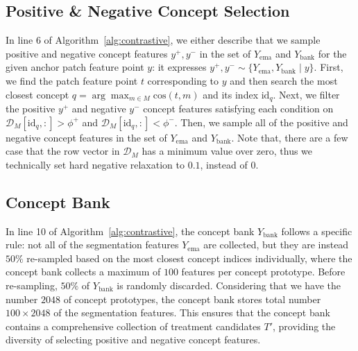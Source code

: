 \documentclass{article} \usepackage{iclr2024_conference,times}
\begin{document}
\subsection{Positive \& Negative Concept Selection}
In line 6 of Algorithm~\ref{alg:contrastive}, we either describe that we sample positive and negative concept features $y^{+}, y^{-}$ in the set of $Y_{\text{ema}}$ and $Y_{\text{bank}}$ for the given anchor patch feature point $y$: it expresses $y^+, y^- \sim \{Y_{\text{ema}}, Y_{\text{bank}}\mid y\}$. First, we find the patch feature point $t$ corresponding to $y$ and then search the most closest concept $q=\arg\max_{m\in M}\text{cos}(t, m)$ and its index $\text{id}_q$. Next, we filter the positive $y^+$ and negative $y^-$ concept features satisfying each condition on $\mathcal{D}_M[\text{id}_q,:]>\phi^+$ and $\mathcal{D}_M[\text{id}_q,:]<\phi^-$. Then, we sample all of the positive and negative concept features in the set of $Y_{\text{ema}}$ and $Y_{\text{bank}}$. Note that, there are a few case that the row vector in $\mathcal{D}_M$ has a minimum value over zero, thus we technically set hard negative relaxation to $0.1$, instead of $0$.

\subsection{Concept Bank}

In line 10 of Algorithm~\ref{alg:contrastive}, the concept bank $Y_{\text{bank}}$ follows a specific rule: not all of the segmentation features $Y_{\text{ema}}$ are collected, but they are instead $50\%$ re-sampled based on the most closest concept indices individually, where the concept bank collects a maximum of $100$ features per concept prototype. Before re-sampling, $50\%$ of $Y_{\text{bank}}$ is randomly discarded. Considering that we have the number $2048$ of concept prototypes, the concept bank stores total number $100 \times 2048$ of the segmentation features. This ensures that the concept bank contains a comprehensive collection of treatment candidates $T'$, providing the diversity of selecting positive and negative concept features.
\end{document}
